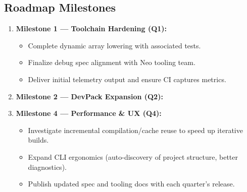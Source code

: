 \documentclass[11pt]{article}
\begin{document}
\subsection{Roadmap Milestones}
\begin{enumerate}
    \item \textbf{Milestone 1 — Toolchain Hardening (Q1):}
    \begin{itemize}
        \item Complete dynamic array lowering with associated tests.
        \item Finalize debug spec alignment with Neo tooling team.
        \item Deliver initial telemetry output and ensure CI captures metrics.
    \end{itemize}
    \item \textbf{Milestone 2 — DevPack Expansion (Q2):}
    \item \textbf{Milestone 4 — Performance \& UX (Q4):}
    \begin{itemize}
        \item Investigate incremental compilation/cache reuse to speed up iterative builds.
        \item Expand CLI ergonomics (auto-discovery of project structure, better diagnostics).
        \item Publish updated spec and tooling docs with each quarter’s release.
    \end{itemize}
\end{enumerate}
\end{document}
